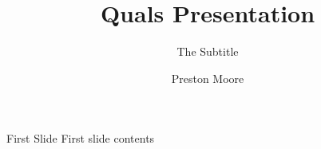 \documentclass[pdf]{beamer}
\title{Quals Presentation}
\subtitle{The Subtitle}
\author{Preston Moore}
\begin{document}
\begin{frame}
  \titlepage{}
\end{frame}


\begin{frame}{First Slide}
  First slide contents
\end{frame}
\end{document}
